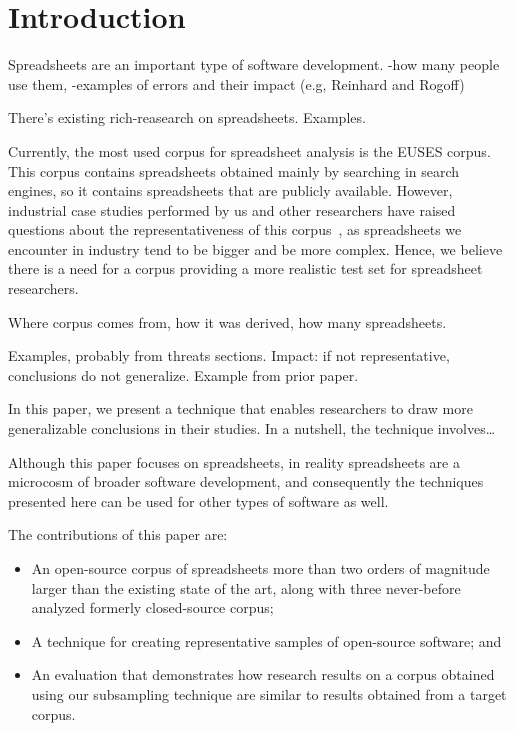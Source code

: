 \documentclass{sig-alternate} %
\begin{document}
\section{Introduction}

Spreadsheets are an important type of software development.
-how many people use them,
-examples of errors and their impact (e.g, Reinhard and Rogoff)

There's existing rich-reasearch on spreadsheets.
Examples.

Currently, the most used corpus for spreadsheet analysis is the EUSES corpus.
This corpus contains spreadsheets obtained mainly by searching in search
engines, so it contains spreadsheets that are publicly available. However,
industrial case studies performed by us and other researchers have raised
questions about the representativeness of this corpus~\cite{something}, as spreadsheets we 
encounter in industry tend to be bigger and be more complex. Hence, we believe
there is a need for a corpus providing a more realistic test set for spreadsheet
researchers.

Where corpus comes from, how it was derived, how many spreadsheets.


Examples, probably from threats sections.
Impact: if not representative, conclusions do not generalize.
Example from prior paper.

In this paper, we present a technique that enables researchers
to draw more generalizable conclusions in their studies.
In a nutshell, the technique involves\ldots

Although this paper focuses on spreadsheets, in reality 
spreadsheets are a microcosm of broader software development,
and consequently the techniques presented here can be used for other 
types of software as well.

The contributions of this paper are:

\begin{itemize}
  \item An open-source corpus of spreadsheets more than two orders of magnitude larger
 		than the existing state of the art, along with three never-before analyzed
 		formerly closed-source corpus;
  \item A technique for creating representative samples of open-source
  		software; and
  \item An evaluation that demonstrates 
		how research results on a corpus obtained using our subsampling technique
		are similar to results obtained from a target corpus.
\end{itemize}
\end{document}
